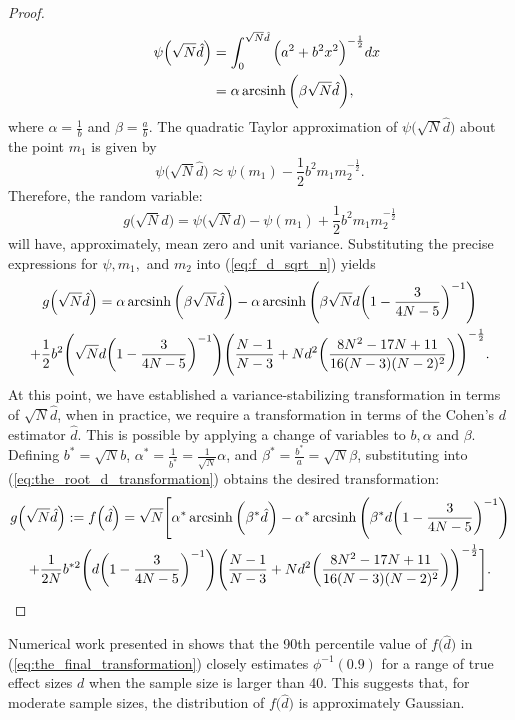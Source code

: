 \begin{proof}
\begin{alignat}{4}
\label{eq:variance_stabilizing_result}
&&\psi\Big(\sqrt{N}\hat{d}\Big)
&= \int_{0}^{\sqrt{N}\hat{d}} \Big(a^{2} + b^{2} x^{2}\Big)^{-\frac{1}{2}} dx \notag\\
&
&
&=  \alpha \operatorname{arcsinh}\bigg({\beta \sqrt{N} \hat{d}}\bigg),
\end{alignat}
where $\alpha = \frac{1}{b}$ and $\beta = \frac{a}{b}.$ The quadratic Taylor approximation of $\psi\Big(\sqrt{N}\hat{d}\Big)$ about the point $m_1$ is given by
\begin{equation}
\label{eq:quadratic taylor approximation}
\psi\Big(\sqrt{N}\hat{d}\Big) \approx \psi(m_{1}) - \frac{1}{2}b^{2}m_{1}m_{2}^{-\frac{1}{2}}.
\end{equation}
Therefore, the random variable:
\begin{equation}
\label{eq:f_d_sqrt_n}
g\Big(\sqrt{N}\hat{d}\Big) = \psi\Big(\sqrt{N}\hat{d}\Big) - \psi(m_{1}) + \frac{1}{2}b^{2}m_{1}m_{2}^{-\frac{1}{2}}        
\end{equation}
will have, approximately, mean zero and unit variance. Substituting the precise expressions for $\psi, m_{1},$ and $m_{2}$  into (\ref{eq:f_d_sqrt_n}) yields
\begin{multline}
\label{eq:the_root_d_transformation}
    g\Big(\sqrt{N}\hat{d}\Big) = \alpha \operatorname{arcsinh}\bigg({\beta \sqrt{N} \hat{d}}\bigg) - \alpha \operatorname{arcsinh}\Bigg({\beta \sqrt{N} d} \bigg(1 - \frac{3}{4N - 5}\bigg)^{-1} \Bigg) \\
    + \frac{1}{2}b^{2}\Bigg(\sqrt{N}d \bigg(1 - \frac{3}{4N - 5}\bigg)^{-1} \Bigg)\Bigg(\frac{N-1}{N-3} + N d^{2} \bigg(\frac{8N^{2} - 17N + 11}{16(N-3)(N-2)^{2}} \bigg)\Bigg)^{-\frac{1}{2}}.
\end{multline}
At this point, we have established a variance-stabilizing transformation in terms of $\sqrt{N}\hat{d}$, when in practice, we require a transformation in terms of the Cohen's $d$ estimator $\hat{d}$. This is possible by applying a change of variables to $b,\alpha$ and $\beta$. Defining $b^{*} = \sqrt{N}b$, $\alpha^{*} = \frac{1}{b^{*}} = \frac{1}{\sqrt{N}}\alpha$, and $\beta^{*} = \frac{b^{*}}{a} = \sqrt{N}\beta$, substituting into (\ref{eq:the_root_d_transformation}) obtains the desired transformation:
\begin{multline}
\label{eq:the_final_transformation}
    g\Big(\sqrt{N}\hat{d}\Big) := f\Big(\hat{d}\Big) = \sqrt{N} \Bigg[\alpha^{*} \operatorname{arcsinh}\bigg({\beta^{*} \hat{d}}\bigg) - \alpha^{*} \operatorname{arcsinh}\Bigg({\beta^{*} d} \bigg(1 - \frac{3}{4N - 5}\bigg)^{-1} \Bigg) \\
                + \frac{1}{2N}b^{*2}\Bigg(d \bigg(1 - \frac{3}{4N - 5}\bigg)^{-1} \Bigg)\Bigg(\frac{N-1}{N-3} + N d^{2} \bigg(\frac{8N^{2} - 17N + 11}{16(N-3)(N-2)^{2}} \bigg)\Bigg)^{-\frac{1}{2}} \Bigg].
\end{multline}
\end{proof}
Numerical work presented in \citet*{Laubscher1960-px} shows that the 90th percentile value of $f\Big(\hat{d}\Big)$ in (\ref{eq:the_final_transformation}) closely estimates $\phi^{-1}({0.9})$ for a range of true effect sizes $d$ when the sample size is larger than 40. This suggests that, for moderate sample sizes, the distribution of $f\Big(\hat{d}\Big)$ is approximately Gaussian.

